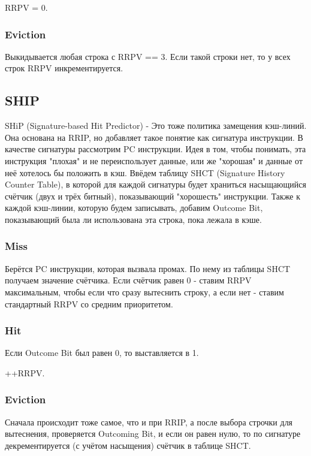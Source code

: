 \documentclass[12pt]{extarticle}
\begin{document}
RRPV = 0.

\subsubsection{Eviction}

Выкидывается любая строка с RRPV == 3. Если такой строки нет, то у всех строк RRPV инкрементируется.

\subsection{SHIP}

SHiP (Signature-based Hit Predictor) - Это тоже политика замещения кэш-линий. Она основана на RRIP, но добавляет такое понятие как сигнатура инструкции. В качестве сигнатуры рассмотрим PC инструкции. Идея в том, чтобы понимать, эта инструкция "плохая" и не переиспользует данные, или же "хорошая" и данные от неё хотелось бы положить в кэш. Ввёдем таблицу SHCT (Signature History Counter Table), в которой для каждой сигнатуры будет храниться насыщающийся счётчик (двух и трёх битный), показывающий "хорошесть" инструкции. Также к каждой кэш-линии, которую будем записывать, добавим Outcome Bit, показывающий была ли использована эта строка, пока лежала в кэше.


\subsubsection{Miss}

Берётся PC инструкции, которая вызвала промах. По нему из таблицы SHCT получаем значение счётчика. Если счётчик равен 0 - ставим RRPV максимальным, чтобы если что сразу вытеснить строку, а если нет - ставим стандартный RRPV со средним приоритетом.

\subsubsection{Hit}

Если Outcome Bit был равен 0, то выставляется в 1. 

++RRPV.

\subsubsection{Eviction}

Сначала происходит тоже самое, что и при RRIP, а после выбора строчки для вытеснения, проверяется Outcoming Bit, и если он равен нулю, то по сигнатуре декрементируется (с учётом насыщения) счётчик в таблице SHCT.
\end{document}
